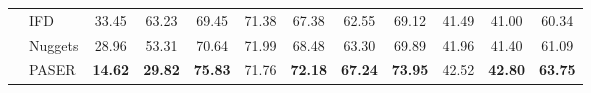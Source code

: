 \begin{table*}[h]
{\begin{tabular}{ll:cc:ccccccc:c}
& IFD & 33.45 & 63.23 & 69.45 & 71.38 & 67.38 & 62.55 & 69.12 & 41.49 & 41.00 & 60.34 \\
& Nuggets & 28.96 & 53.31 & 70.64 & 71.99 & 68.48 & 63.30 & 69.89 & 41.96 & 41.40 & 61.09  \\
& PASER & \textbf{14.62} & \textbf{29.82} & \textbf{75.83} & 71.76 & \textbf{72.18} & \textbf{67.24} & \textbf{73.95} & 42.52 & \textbf{42.80} & \textbf{63.75}  \\
\hline
\bottomrule
\end{tabular}}
\label{tab: different llms}
\end{table*}
\vspace{-2mm}